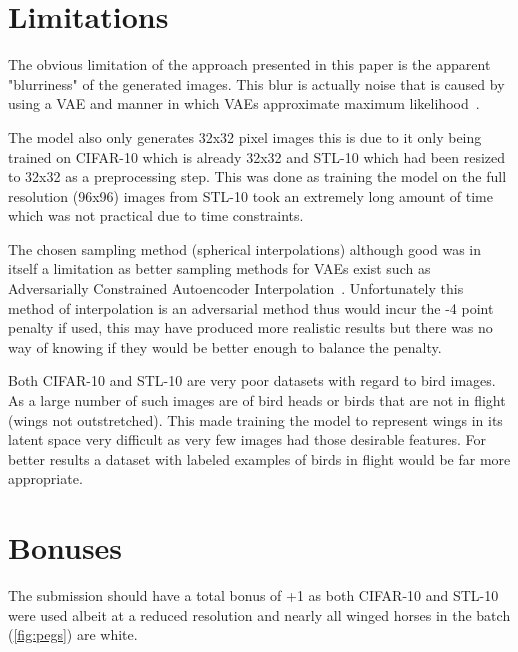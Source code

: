 \documentclass{article}
\begin{document}
\section{Limitations}
The obvious limitation of the approach presented in this paper is the apparent "blurriness" of the generated images. This blur is actually noise that is caused by using a VAE and manner in which VAEs approximate maximum likelihood~\cite{blur}.
\par
The model also only generates 32x32 pixel images this is due to it only being trained on CIFAR-10 which is already 32x32 and STL-10 which had been resized to 32x32 as a preprocessing step. This was done as training the model on the full resolution (96x96) images from STL-10 took an extremely long amount of time which was not practical due to time constraints.
\par
The chosen sampling method (spherical interpolations) although good was in itself a limitation as better sampling methods for VAEs exist such as Adversarially Constrained Autoencoder Interpolation~\cite{acai}. Unfortunately this method of interpolation is an adversarial method thus would incur the -4 point penalty if used, this may have produced more realistic results but there was no way of knowing if they would be better enough to balance the penalty.
\par
Both CIFAR-10 and STL-10 are very poor datasets with regard to bird images. As a large number of such images are of bird heads or birds that are not in flight (wings not outstretched). This made training the model to represent wings in its latent space very difficult as very few images had those desirable features. For better results a dataset with labeled examples of birds in flight would be far more appropriate.
\section*{Bonuses}
The submission should have a total bonus of +1 as both CIFAR-10 and STL-10 were used albeit at a reduced resolution and nearly all winged horses in the batch (\autoref{fig:pegs}) are white.

\printbibliography
\end{document}
